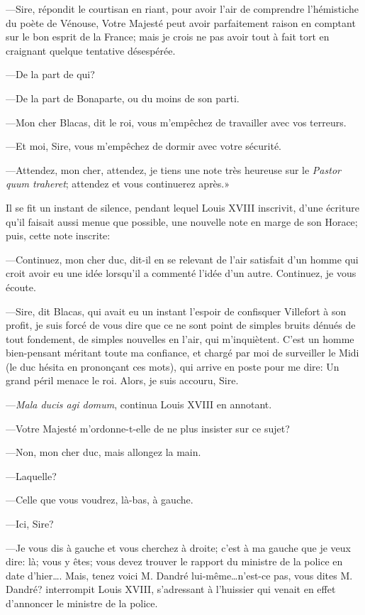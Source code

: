 —Sire, répondit le courtisan en riant, pour avoir l'air de comprendre l'hémistiche du poète de Vénouse, Votre Majesté peut avoir parfaitement raison en comptant sur le bon esprit de la France; mais je crois ne pas avoir tout à fait tort en craignant quelque tentative désespérée.

—De la part de qui?

—De la part de Bonaparte, ou du moins de son parti.

—Mon cher Blacas, dit le roi, vous m'empêchez de travailler avec vos terreurs.

—Et moi, Sire, vous m'empêchez de dormir avec votre sécurité.

—Attendez, mon cher, attendez, je tiens une note très heureuse sur le \textit{Pastor quum traheret}; attendez et vous continuerez après.»

Il se fit un instant de silence, pendant lequel Louis XVIII inscrivit, d'une écriture qu'il faisait aussi menue que possible, une nouvelle note en marge de son Horace; puis, cette note inscrite:

—Continuez, mon cher duc, dit-il en se relevant de l'air satisfait d'un homme qui croit avoir eu une idée lorsqu'il a commenté l'idée d'un autre. Continuez, je vous écoute.

—Sire, dit Blacas, qui avait eu un instant l'espoir de confisquer Villefort à son profit, je suis forcé de vous dire que ce ne sont point de simples bruits dénués de tout fondement, de simples nouvelles en l'air, qui m'inquiètent. C'est un homme bien-pensant méritant toute ma confiance, et chargé par moi de surveiller le Midi (le duc hésita en prononçant ces mots), qui arrive en poste pour me dire: Un grand péril menace le roi. Alors, je suis accouru, Sire.

—\textit{Mala ducis agi domum}, continua Louis XVIII en annotant.

—Votre Majesté m'ordonne-t-elle de ne plus insister sur ce sujet?

—Non, mon cher duc, mais allongez la main.

—Laquelle?

—Celle que vous voudrez, là-bas, à gauche.

—Ici, Sire?

—Je vous dis à gauche et vous cherchez à droite; c'est à ma gauche que je veux dire: là; vous y êtes; vous devez trouver le rapport du ministre de la police en date d'hier\dots. Mais, tenez voici M. Dandré lui-même\dots n'est-ce pas, vous dites M. Dandré? interrompit Louis XVIII, s'adressant à l'huissier qui venait en effet d'annoncer le ministre de la police.

